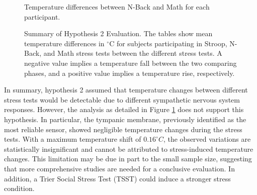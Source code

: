 \begin{figure}[!t]
    \begin{subtable}{\textwidth}
        \centering
        \caption{Temperature differences between N-Back and Math for each participant.}
        \label{subsec:Evaluation:Study2:Hypothesis2:temp_diff_nback_math}
    \end{subtable}
    
    \caption{Summary of Hypothesis 2 Evaluation. The tables show mean temperature differences in \(^\circ\text{C}\) for subjects participating in Stroop, N-Back, and Math stress tests between the different stress tests. A negative value implies a temperature fall between the two comparing phases, and a positive value implies a temperature rise, respectively.}

    \label{sec:Evaluation:Study2:Hypothesis2:Summary}
\end{figure}

In summary, hypothesis 2 assumed that temperature changes between different stress tests would be detectable due to different sympathetic nervous system responses. However, the analysis as detailed in Figure \ref{sec:Evaluation:Study2:Hypothesis2:Summary} does not support this hypothesis. In particular, the tympanic membrane, previously identified as the most reliable sensor, showed negligible temperature changes during the stress tests. With a maximum temperature shift of $0.16 ^\circ C$, the observed variations are statistically insignificant and cannot be attributed to stress-induced temperature changes. This limitation may be due in part to the small sample size, suggesting that more comprehensive studies are needed for a conclusive evaluation.
In addition, a Trier Social Stress Test (TSST) could induce a stronger stress condition.


